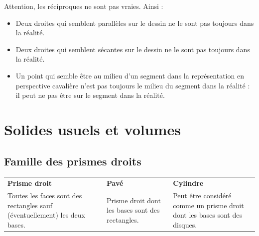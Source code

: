 \begin{rmqs} Attention, les r\'eciproques ne sont pas vraies. Ainsi :
\begin{itemize}
 \item Deux droites qui semblent parallèles sur le dessin ne le sont pas toujours dans la réalité.
 \item Deux droites qui semblent sécantes sur le dessin ne le sont pas toujours dans la réalité.
 \item Un point qui semble \^etre au milieu d'un segment dans la repr\'esentation en perspective cavali\`ere n'est pas toujours le milieu du segment dans la r\'ealit\'e : il peut ne pas \^etre sur le segment dans la r\'ealit\'e.
\end{itemize}

 
\end{rmqs}



\section{Solides usuels et volumes}


\subsection{Famille des prismes droits}

\begin{center}
\begin{tabular}{p{5cm} p{5cm} p{5cm}}
\textbf{Prisme droit} & \textbf{Pavé} & \textbf{Cylindre} \\
Toutes les faces sont des rectangles sauf (éventuellement) les deux bases. & Prisme droit dont les bases sont des rectangles. & Peut être considéré comme un prisme droit dont les bases sont des disques. \\
\end{tabular}
\end{center}

